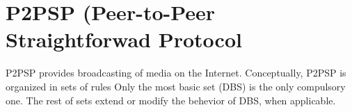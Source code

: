\section{P2PSP (Peer-to-Peer Straightforwad Protocol}
\label{sec:proposal}

P2PSP provides broadcasting of media on the Internet. 
Conceptually, P2PSP is organized in sets of rules
Only the most basic set (DBS) is the only compulsory one. The rest of
sets extend or modify the behevior of DBS, when applicable.








%

